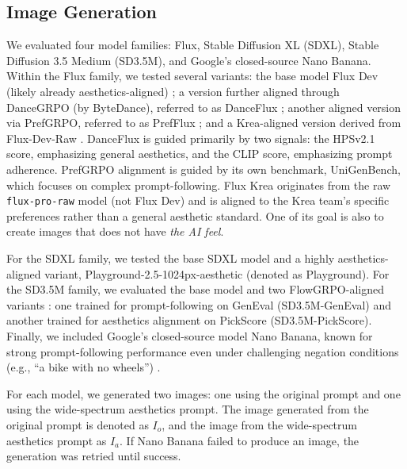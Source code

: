 
\subsection{Image Generation}

We evaluated four model families: Flux, Stable Diffusion XL (SDXL), Stable Diffusion 3.5 Medium (SD3.5M), and Google’s closed-source Nano Banana. Within the Flux family, we tested several variants: the base model Flux Dev (likely already aesthetics-aligned) \cite{noauthor_black-forest-labsflux1-dev_2025}; a version further aligned through DanceGRPO (by ByteDance), referred to as DanceFlux \cite{xue_dancegrpo_2025}; another aligned version via PrefGRPO, referred to as PrefFlux \cite{wang_pref-grpo_2025}; and a Krea-aligned version derived from Flux-Dev-Raw \cite{noauthor_releasing_2025}. DanceFlux is guided primarily by two signals: the HPSv2.1 score, emphasizing general aesthetics, and the CLIP score, emphasizing prompt adherence. PrefGRPO alignment is guided by its own benchmark, UniGenBench, which focuses on complex prompt-following. Flux Krea originates from the raw \texttt{flux-pro-raw} model (not Flux Dev) and is aligned to the Krea team’s specific preferences rather than a general aesthetic standard. One of its goal is also to create images that does not have \textit{the AI feel}. 

For the SDXL family, we tested the base SDXL model and a highly aesthetics-aligned variant, Playground-2.5-1024px-aesthetic (denoted as Playground). For the SD3.5M family, we evaluated the base model and two FlowGRPO-aligned variants \cite{liu_flow-grpo_2025}: one trained for prompt-following on GenEval (SD3.5M-GenEval) and another trained for aesthetics alignment on PickScore (SD3.5M-PickScore). Finally, we included Google’s closed-source model Nano Banana, known for strong prompt-following performance even under challenging negation conditions (e.g., ``a bike with no wheels'') \cite{guo_vsf_2025}.

For each model, we generated two images: one using the original prompt and one using the wide-spectrum aesthetics prompt. The image generated from the original prompt is denoted as $I_o$, and the image from the wide-spectrum aesthetics prompt as $I_a$. If Nano Banana failed to produce an image, the generation was retried until success.

